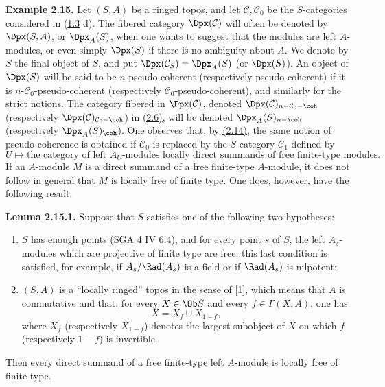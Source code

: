 \textbf{Example 2.15.} Let \((S,A)\) be a ringed topos, and let \(\mathcal C,\mathcal C_0\) be the \(S\)-categories considered in (\hyperlink{sga6.e01.sec.1.3}{1.3} d). The fibered category \(\Dpx(\mathcal C)\) will often be denoted by \(\Dpx(S,A)\), or \(\Dpx_A(S)\), when one wants to suggest that the modules are left \(A\)-modules, or even simply \(\Dpx(S)\) if there is no ambiguity about \(A\). We denote by \(S\) the final object of \(S\), and put \(\Dpx(\mathcal C_S)=\Dpx_A(S)\) (or \(\Dpx(S)\)). An object of \(\Dpx(S)\) will be said to be \(n\)-pseudo-coherent (respectively pseudo-coherent) if it is \(n\)-\(\mathcal C_0\)-pseudo-coherent (respectively \(\mathcal C_0\)-pseudo-coherent), and similarly for the strict notions. The category fibered in \(\Dpx(\mathcal C)\), denoted \(\Dpx(\mathcal C)_{n-\mathcal C_0-\coh}\) (respectively \(\Dpx(\mathcal C)_{\mathcal C_0-\coh}\)) in \hyperlink{sga6.e01.schol.2-6}{(2.6)}, will be denoted \(\Dpx_A(S)_{n-\coh}\) (respectively \(\Dpx_A(S)_{\coh}\)). One observes that, by \hyperlink{sga6.e01.cor.2-14}{(2.14)}, the same notion of pseudo-coherence is obtained if \(\mathcal C_0\) is replaced by the \(S\)-category \(\mathcal C_1\) defined by
\[
  U\longmapsto \text{the category of left }A_U\text{-modules locally direct summands of free finite-type modules}.
\]
If an \(A\)-module \(M\) is a direct summand of a free finite-type \(A\)-module, it does not follow in general that \(M\) is locally free of finite type. One does, however, have the following result.

\textbf{Lemma 2.15.1.} Suppose that \(S\) satisfies one of the following two hypotheses:
\begin{enumerate}[label=(\roman*)]
\item \(S\) has enough points (SGA 4 IV 6.4), and for every point \(s\) of \(S\), the left \(A_s\)-modules which are projective of finite type are free; this last condition is satisfied, for example, if \(A_s/\Rad(A_s)\) is a field or if \(\Rad(A_s)\) is nilpotent;
\item \((S,A)\) is a ``locally ringed'' topos in the sense of [1], which means that \(A\) is commutative and that, for every \(X\in\Ob S\) and every \(f\in\Gamma(X,A)\), one has
\[
  X=X_f\cup X_{1-f},
\]
where \(X_f\) (respectively \(X_{1-f}\)) denotes the largest subobject of \(X\) on which \(f\) (respectively \(1-f\)) is invertible.
\end{enumerate}
Then every direct summand of a free finite-type left \(A\)-module is locally free of finite type.

